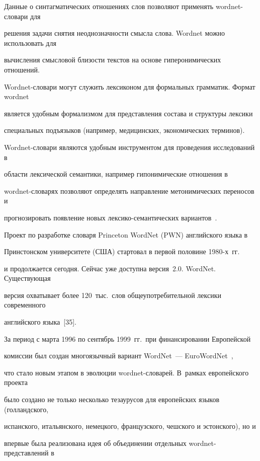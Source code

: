 Данные о синтагматических отношениях слов позволяют применять wordnet-словари для 


решения задачи снятия неоднозначности смысла слова. Wordnet можно использовать для 


вычисления смысловой близости текстов на основе гиперонимических отношений. 


Wordnet-словари могут служить лексиконом для формальных грамматик. Формат wordnet 


является удобным формализмом для представления состава и структуры лексики 


специальных подъязыков (например, медицинских, экономических терминов). 


      Wordnet-словари являются удобным инструментом для проведения исследований в 


области лексической семантики, например гипонимические отношения в 


wordnet-словарях позволяют определять направление метонимических переносов и 


прогнозировать появление новых лексико-семантических вариантов~\cite{33-2-11}.


      


      Проект по разработке словаря Princeton WordNet (PWN) английского языка в 


Принстонском университете (США) стартовал в первой половине 1980-х~гг.\ 


и продолжается сегодня. Сейчас уже доступна версия~2.0. WordNet. Существующая 


версия охватывает более 120~тыс.\ слов общеупотребительной лексики современного 


английского языка~[35].


      


      За период с марта 1996 по сентябрь 1999~гг.\ при финансировании Европейской 


комиссии был создан многоязычный вариант WordNet~--- EuroWordNet~\cite{35-2-11}, 


что стало новым этапом в эволюции wordnet-словарей. В~рамках европейского проекта 


было создано не только несколько тезаурусов для европейских языков (голландского, 


испанского, итальянского, немецкого, французского, чешского и эстонского), но и 


впервые была реализована идея об объединении отдельных wordnet-представлений в 


